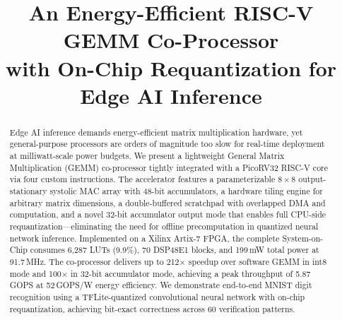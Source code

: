 \documentclass[conference]{IEEEtran}
\begin{document}
\title{An Energy-Efficient RISC-V GEMM Co-Processor\\with On-Chip Requantization for Edge AI Inference}

\author{
\and
{}
\and
{}
}

\maketitle

\begin{abstract}
Edge AI inference demands energy-efficient matrix multiplication hardware, yet general-purpose processors are orders of magnitude too slow for real-time deployment at milliwatt-scale power budgets. We present a lightweight General Matrix Multiplication (GEMM) co-processor tightly integrated with a PicoRV32 RISC-V core via four custom instructions. The accelerator features a parameterizable $8\times8$ output-stationary systolic MAC array with 48-bit accumulators, a hardware tiling engine for arbitrary matrix dimensions, a double-buffered scratchpad with overlapped DMA and computation, and a novel 32-bit accumulator output mode that enables full CPU-side requantization---eliminating the need for offline precomputation in quantized neural network inference. Implemented on a Xilinx Artix-7 FPGA, the complete System-on-Chip consumes 6{,}287 LUTs (9.9\%), 70 DSP48E1 blocks, and 199\,mW total power at 91.7\,MHz. The co-processor delivers up to 212$\times$ speedup over software GEMM in int8 mode and 100$\times$ in 32-bit accumulator mode, achieving a peak throughput of 5.87\,GOPS at 52\,GOPS/W energy efficiency. We demonstrate end-to-end MNIST digit recognition using a TFLite-quantized convolutional neural network with on-chip requantization, achieving bit-exact correctness across 60 verification patterns.
\end{abstract}
\end{document}
